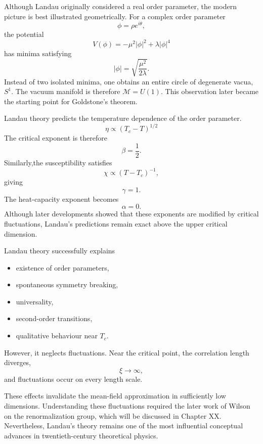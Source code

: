 Although Landau originally considered a real order parameter, the modern
picture is best illustrated geometrically.
For a complex order parameter 
\[\phi=\rho e^{i\theta},\]
the potential
\[V(\phi)=-\mu^2|\phi|^2+\lambda|\phi|^4\]
has minima satisfying
\[|\phi|=\sqrt{\frac{\mu^2}{2\lambda}}.\]
Instead of two isolated minima,
one obtains an entire circle of degenerate vacua,$S^1.$
The vacuum manifold is therefore $\mathcal M=U(1).$
This observation later became the starting point for Goldstone's theorem.

Landau theory predicts the temperature dependence of the order
parameter.
\[\boxed{\eta \propto (T_c-T)^{1/2}}\]
The critical exponent is therefore
\[\beta=\frac{1}{2}.\]
Similarly,the susceptibility satisfies
\[\chi \propto (T-T_c)^{-1},\]
giving
\[\gamma=1.\]
The heat-capacity exponent becomes
\[\alpha=0.\]
Although later developments showed that these exponents are modified by
critical fluctuations, Landau's predictions remain exact above the upper
critical dimension.

Landau theory successfully explains
\begin{itemize}
\item existence of order parameters,
\item spontaneous symmetry breaking,
\item universality,
\item second-order transitions,
\item qualitative behaviour near $T_c$.
\end{itemize}
However, it neglects fluctuations.
Near the critical point, the correlation length diverges,
\[\xi \rightarrow \infty,\]
and fluctuations occur on every length scale.

These effects invalidate the mean-field approximation in sufficiently
low dimensions.
Understanding these fluctuations required the later work of Wilson on
the renormalization group, which will be discussed in Chapter XX.
Nevertheless,
Landau's theory remains one of the most influential conceptual advances
in twentieth-century theoretical physics.

